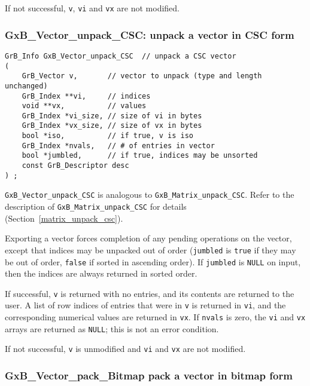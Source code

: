 \documentclass[12pt]{article}
\begin{document}
If not successful, \verb'v', \verb'vi' and
\verb'vx' are not modified.

\newpage
\subsubsection{{\sf GxB\_Vector\_unpack\_CSC:} unpack a vector in CSC form}
\label{vector_unpack_csc}

\begin{mdframed}[userdefinedwidth=6in]
{\footnotesize
\begin{verbatim}
GrB_Info GxB_Vector_unpack_CSC  // unpack a CSC vector
(
    GrB_Vector v,       // vector to unpack (type and length unchanged)
    GrB_Index **vi,     // indices
    void **vx,          // values
    GrB_Index *vi_size, // size of vi in bytes
    GrB_Index *vx_size, // size of vx in bytes
    bool *iso,          // if true, v is iso
    GrB_Index *nvals,   // # of entries in vector
    bool *jumbled,      // if true, indices may be unsorted
    const GrB_Descriptor desc
) ;
\end{verbatim}
} \end{mdframed}

\verb'GxB_Vector_unpack_CSC' is analogous to \verb'GxB_Matrix_unpack_CSC'.
Refer to the description of \verb'GxB_Matrix_unpack_CSC' for details
(Section~\ref{matrix_unpack_csc}).

Exporting a vector forces completion of any pending operations on the vector,
except that indices may be unpacked out of order (\verb'jumbled' is \verb'true'
if they may be out of order, \verb'false' if sorted in ascending order).  If
\verb'jumbled' is \verb'NULL' on input, then the indices are always returned in
sorted order.

If successful, \verb'v' is returned with no entries, and its contents are
returned to the user.
A list of row indices of entries that were in
\verb'v' is returned in \verb'vi', and the corresponding numerical values are
returned in \verb'vx'.  If \verb'nvals' is zero, the \verb'vi' and \verb'vx'
arrays are returned as \verb'NULL'; this is not an error condition.

If not successful, \verb'v' is unmodified and \verb'vi' and \verb'vx' are
not modified.

\newpage
\subsubsection{{\sf GxB\_Vector\_pack\_Bitmap} pack a vector in bitmap form}
\label{vector_pack_bitmap}
\end{document}
